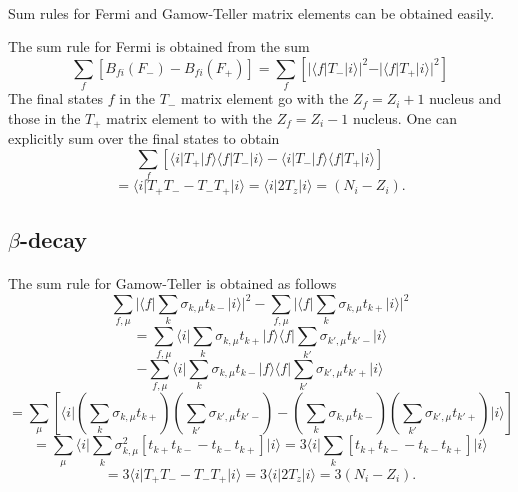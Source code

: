 \documentclass[%
oneside,                 %
final,                   %
10pt]{article}
\begin{document}
\paragraph{}
Sum rules for Fermi and Gamow-Teller matrix elements can be obtained easily.

The sum rule for Fermi is obtained from the sum
\[
\sum _{f} \left[ B_{fi}(F_{-}) - B_{fi}(F_{+}) \right]
=\sum _{f} \left[ \vert \langle f\vert  T_{-} \vert i\rangle\vert ^{2} -  \vert \langle f\vert  T_{+} \vert 
i\rangle\vert ^{2} \right]
\]
The final states $f$ in the $T_{-}$ matrix element go
with the $Z_{f}=Z_{i}+1$ nucleus and those in the $T_{+}$ matrix element
to with the $Z_{f}=Z_{i}-1$ nucleus. One can explicitly sum over the
final states to obtain
\[
\sum _{f} \left[ \langle i\vert  T_{+} \vert f\rangle \langle f\vert T_{-}\vert i\rangle -  \langle i\vert  T_{-} \vert f\rangle \langle f\vert T_{+}\vert i\rangle \right]
\]
\[
= \langle i\vert  T_{+} T_{-} -  T_{-} T_{+}\vert i\rangle =\langle i\vert  2T_{z}\vert i\rangle  = (N_{i}-Z_{i}).       
\]



\subsection{$\beta$-decay}

\paragraph{}
The sum rule for Gamow-Teller is obtained as follows
\[
\sum_{f,\mu}  \vert \langle f\vert  \sum_{k} \sigma_{k,\mu} t_{k-} \vert i\rangle\vert^{2}
- \sum_{f,\mu} \vert \langle f\vert  \sum_{k} \sigma_{k,\mu } t_{k+} \vert i\rangle\vert^{2}
\]
\[
= \sum_{f,\mu}\langle i\vert  \sum_{k} \sigma_{k,\mu} t_{k+} \vert f\rangle\langle f\vert  \sum_{k'} 
\sigma_{k',\mu} t_{k'-} \vert i\rangle
\]
\[
-  \sum_{f,\mu}
\langle i\vert  \sum_{k} \sigma_{k,\mu } t_{k-} \vert f\rangle\langle f\vert\sum_{k'} 
\sigma_{k',\mu } t_{k'+} \vert i\rangle
\]
\[
= \sum_{\mu} \left[\langle i\vert  \left(\sum _{k} \sigma_{k,\mu} t_{k+} \right)
    \left( \sum_{k'} \sigma_{k',\mu} t_{k'-}\right)
-   \left( \sum_{k} \sigma_{k,\mu} t_{k-} \right)
\left( \sum_{k'} \sigma_{k',\mu} t_{k'+} \right) \vert i\rangle
\right]
\]
\[
= \sum_{\mu }
\langle i\vert  \sum_{k}  \sigma ^{2}_{k,\mu } \left[ t_{k+} t_{k-} - t_{k-} t_{k+} \right] 
\vert i\rangle
= 3
\langle i\vert  \sum_{k} \left[ t_{k+} t_{k-} - t_{k-} t_{k+} \right] \vert i\rangle
\]
\[
=   3\langle i\vert  T_{+} T_{-} -  T_{-} T_{+}\vert i\rangle= 3\langle i\vert  2T_{z}\vert i\rangle  = 3(N_{i}-Z_{i}). 
\]
\end{document}
